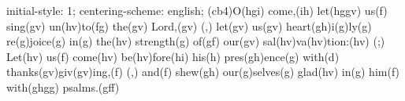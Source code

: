 initial-style: 1;
centering-scheme: english;
(cb4)O(hgi) come,(ih) let(hggv) us(f) sing(gv) un(hv)to(fg) the(gv) Lord,(gv) (,) let(gv) us(gv) heart(gh)i(g)ly(g) re(g)joice(g) in(g) the(hv) strength(g) of(gf) our(gv) sal(hv)va(hv)tion:(hv) (;) Let(hv) us(f) come(hv) be(hv)fore(hi) his(h) pres(gh)ence(g) with(d) thanks(gv)giv(gv)ing,(f) (,) and(f) shew(gh) our(g)selves(g) glad(hv) in(g) him(f) with(ghgg) psalms.(gff)
